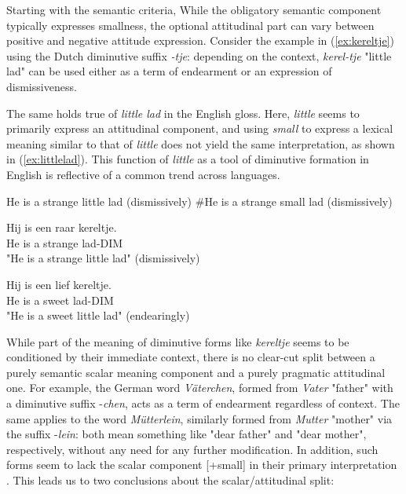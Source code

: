 Starting with the semantic criteria, While the obligatory semantic component typically expresses smallness, the optional attitudinal part can vary between positive and negative attitude expression. Consider the example in (\ref{ex:kereltje}) using the Dutch diminutive suffix \textit{-tje}: depending on the context, \textit{kerel-tje} "little lad" can be used either as a term of endearment or an expression of dismissiveness.

The same holds true of \textit{little lad} in the English gloss. Here, \textit{little} seems to primarily express an attitudinal component, and using \textit{small} to express a lexical meaning similar to that of \textit{little} does not yield the same interpretation, as shown in (\ref{ex:littlelad}). This function of \textit{little} as a tool of diminutive formation in English is reflective of a common trend across languages.

\begin{exe}
\ex \label{ex:littlelad}
\begin{xlist}
\ex He is a strange little lad (dismissively)
\ex \#He is a strange small lad (dismissively)
\end{xlist}
\end{exe}

\begin{exe}
\ex \label{ex:kereltje} 
\begin{xlist}
\ex \gll
Hij is een raar kereltje.\\
He	is	a  strange	lad-DIM\\
\trans "He is a strange little lad" (dismissively)

\ex \gll
Hij is een lief kereltje.\\
He	is	a  sweet	lad-DIM\\
\trans "He is a sweet little lad" (endearingly)
\end{xlist}
\end{exe}

While part of the meaning of diminutive forms like \textit{kereltje} seems to be conditioned by their immediate context, there is no clear-cut split between a purely semantic scalar meaning component and a purely pragmatic attitudinal one. For example, the German word \textit{Väterchen}, formed from \textit{Vater} "father" with a diminutive suffix -\textit{chen}, acts as a term of endearment regardless of context. The same applies to the word \textit{Mütterlein}, similarly formed from \textit{Mutter} "mother" via the suffix -\textit{lein}: both mean something like "dear father" and "dear mother", respectively, without any need for any further modification. In addition, such forms seem to lack the scalar component [+small] in their primary interpretation \parencite{Schneider+2003}. This leads us to two conclusions about the scalar/attitudinal split:

